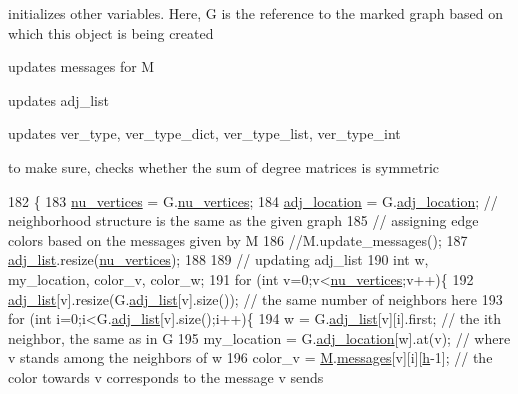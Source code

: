 initializes other variables. Here, G is the reference to the marked graph based on which this object is being created 


\begin{DoxyItemize}
\item updates messages for M
\item updates adj\+\_\+list
\item updates ver\+\_\+type, ver\+\_\+type\+\_\+dict, ver\+\_\+type\+\_\+list, ver\+\_\+type\+\_\+int
\item to make sure, checks whether the sum of degree matrices is symmetric 
\end{DoxyItemize}
\begin{DoxyCode}
182 \{
183   \hyperlink{classcolored__graph_a90ece8eb1fec52f3f41549ab527c1d5b}{nu\_vertices} = G.\hyperlink{classmarked__graph_acf79c6aeb8f32614cb14a5baaa6c9f9b}{nu\_vertices};
184   \hyperlink{classcolored__graph_ad657e7e86bee874d19dbc1765e1edaa7}{adj\_location} = G.\hyperlink{classmarked__graph_a3ae722ea9583ad23af34d789a88ac01a}{adj\_location}; \textcolor{comment}{// neighborhood structure is the same as the given
       graph}
185   \textcolor{comment}{// assigning edge colors based on the messages given by M}
186   \textcolor{comment}{//M.update\_messages();}
187   \hyperlink{classcolored__graph_a45dce16965079286cf3f41a54a1b2ea4}{adj\_list}.resize(\hyperlink{classcolored__graph_a90ece8eb1fec52f3f41549ab527c1d5b}{nu\_vertices});
188 
189   \textcolor{comment}{// updating adj\_list}
190   \textcolor{keywordtype}{int} w, my\_location, color\_v, color\_w;
191   \textcolor{keywordflow}{for} (\textcolor{keywordtype}{int} v=0;v<\hyperlink{classcolored__graph_a90ece8eb1fec52f3f41549ab527c1d5b}{nu\_vertices};v++)\{
192     \hyperlink{classcolored__graph_a45dce16965079286cf3f41a54a1b2ea4}{adj\_list}[v].resize(G.\hyperlink{classmarked__graph_a1a0bf7ca413a278763f7c878b3b6fd6f}{adj\_list}[v].size()); \textcolor{comment}{// the same number of neighbors here}
193     \textcolor{keywordflow}{for} (\textcolor{keywordtype}{int} i=0;i<G.\hyperlink{classmarked__graph_a1a0bf7ca413a278763f7c878b3b6fd6f}{adj\_list}[v].size();i++)\{
194       w = G.\hyperlink{classmarked__graph_a1a0bf7ca413a278763f7c878b3b6fd6f}{adj\_list}[v][i].first; \textcolor{comment}{// the ith neighbor, the same as in G}
195       my\_location = G.\hyperlink{classmarked__graph_a3ae722ea9583ad23af34d789a88ac01a}{adj\_location}[w].at(v); \textcolor{comment}{// where v stands among the neighbors of w}
196       color\_v = \hyperlink{classcolored__graph_ab72c568fe12f7c849ca6bffb145aec47}{M}.\hyperlink{classgraph__message_aac77e098f0acf9650116a8e51fe3b4b7}{messages}[v][i][\hyperlink{classcolored__graph_ae27062a4ee59df2670d3a0c81e85a3fa}{h}-1]; \textcolor{comment}{// the color towards v corresponds to the message v sends
}
\end{DoxyCode}
